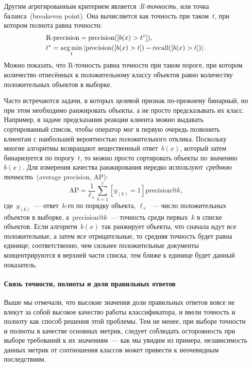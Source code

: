 \documentclass[12pt,fleqn]{article}
\begin{document}
Другим агрегированным критерием является~\emph{R-точность},
или точка баланса~(breakeven point).
Она вычисляется как точность при таком~$t$, при котором полнота равна точности:
\begin{align*}
    &\text{R-precision}
    =
    \text{precision}([b(x) > t^*]),\\
    &t^* = \mathop{\rm arg\,min}\limits_t \left|
        \text{precision}([b(x) > t])
        -
        \text{recall}([b(x) > t])
    \right|.
\end{align*}
Можно показать, что R-точность равна точности при таком пороге,
при котором количество отнесённых к положительному классу объектов
равно количеству положительных объектов в выборке.

Часто встречаются задачи, в которых целевой признак по-прежнему бинарный,
но при этом необходимо ранжировать объекты, а не просто предсказывать их класс.
Например, в задаче предсказания реакции клиента можно выдавать сортированный список,
чтобы оператор мог в первую очередь позвонить клиентам с наибольшей вероятностью
положительного отклика.
Поскольку многие алгоритмы возвращают вещественный ответ~$b(x)$,
который затем бинаризуется по порогу~$t$,
то можно просто сортировать объекты по значению~$b(x)$.
Для измерения качества ранжирования нередко используют~\emph{среднюю точность}~(average precision, AP):
\[
    \text{AP}
    =
    \frac{1}{\ell_{+}}
    \sum_{k = 1}^{\ell}
        [y_{(k)} = 1] \text{precision}@k,
\]
где~$y_{(k)}$~--- ответ~$k$-го по порядку объекта,
$\ell_{+}$~--- число положительных объектов в выборке,
а~$\text{precision}@k$~--- точность среди первых~$k$ в списке объектов.
Если алгоритм~$b(x)$ так ранжирует объекты, что сначала идут все положительные,
а затем все отрицательные, то средняя точность будет равна единице;
соответственно, чем сильнее положительные документы концентрируются в верхней
части списка, тем ближе к единице будет данный показатель.

\paragraph{Связь точности, полноты и доли правильных ответов}
Выше мы отмечали, что высокие значения доли правильных ответов вовсе не влекут
за собой высокое качество работы классификатора,
и ввели точность и полноту как способ решения этой проблемы.
Тем не менее, при выборе точности и полноты в качестве основных метрик, следует
соблюдать осторожность при выборе требований к их значениям~--- как мы увидим из примера,
независимость данных метрик от соотношения классов может привести к неочевидным последствиям.
\end{document}

